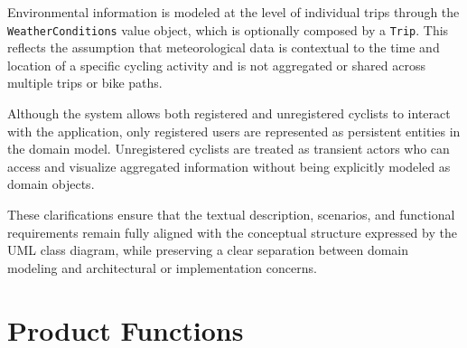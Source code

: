 \par Environmental information is modeled at the level of individual trips through the \texttt{WeatherConditions} value object, which is optionally composed by a \texttt{Trip}. This reflects the assumption that meteorological data is contextual to the time and location of a specific cycling activity and is not aggregated or shared across multiple trips or bike paths.

\par Although the system allows both registered and unregistered cyclists to interact with the application, only registered users are represented as persistent entities in the domain model. Unregistered cyclists are treated as transient actors who can access and visualize aggregated information without being explicitly modeled as domain objects.

\par These clarifications ensure that the textual description, scenarios, and functional requirements remain fully aligned with the conceptual structure expressed by the UML class diagram, while preserving a clear separation between domain modeling and architectural or implementation concerns.

\section{Product Functions}
\label{sec:product_functions}%

